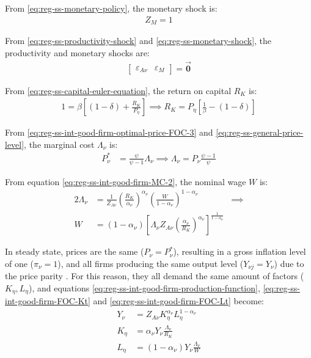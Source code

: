 \documentclass[
thesis.tex
]{subfiles}
\begin{document}
From \ref{eq:reg-ss-monetary-policy}, the monetary shock is:
\begin{align}
	Z_{M} = 1
\end{align}

From \ref{eq:reg-ss-productivity-shock} and \ref{eq:reg-ss-monetary-shock}, the productivity and monetary shocks are:
\begin{align}
	\begin{bmatrix}
		\varepsilon_{A\nu} & \varepsilon_{M}
	\end{bmatrix} = \vec{\bm{0}}
\end{align}

From \ref{eq:reg-ss-capital-euler-equation}, the return on capital $R_K$ is:
\begin{align}
	\label{eq:reg-ss-return-on-capital}
	1 = \beta \left[ (1-\delta) + \frac{R_K}{P_{\eta}} \right] \implies 
	R_K = P_{\eta} \left[ \frac{1}{\beta} - (1-\delta) \right]
\end{align}

From \ref{eq:reg-ss-int-good-firm-optimal-price-FOC-3} and \ref{eq:reg-ss-general-price-level}, the marginal cost $\Lambda_{\nu}$ is:
\begin{align}
	P_{\nu}^\ast &= \frac{\psi}{\psi-1} \Lambda_{\nu} \implies \Lambda_{\nu} = P_{\nu} \frac{\psi-1}{\psi} \label{eq:reg-ss-marginal-cost}
\end{align}

From equation \ref{eq:reg-ss-int-good-firm-MC-2}, the nominal wage $W$ is:
\begin{alignat}{2}
	\Lambda_{\nu} &= \frac{1}{Z_{A\nu}} \left( \frac{R_K}{{\alpha_\nu}} \right)^{{\alpha_\nu}} \left( \frac{W}{1-{\alpha_\nu}} \right)^{1-{\alpha_\nu}} &\implies \nonumber \\ 
	W &= (1-{\alpha_\nu}) \left[ \Lambda_{\nu} Z_{A\nu} \left( \frac{{\alpha_\nu}}{R_K} \right)^{{\alpha_\nu}} \right]^\frac{1}{1-{\alpha_\nu}} &\, \label{eq:reg-ss-nominal-wage}
\end{alignat}

In steady state, prices are the same ($P_{\nu} = P_{\nu}^\ast$), resulting in a gross inflation level of one ($\pi_{\nu} = 1$), and all firms producing the same output level ($Y_{\nu j} = Y_{\nu}$) due to the price parity \cite[Lecture 13, p.12]{solis-garcia_ucb_2022}. For this reason, they all demand the same amount of factors ($K_{\eta}, L_{\eta}$), and equations \ref{eq:reg-ss-int-good-firm-production-function}, \ref{eq:reg-ss-int-good-firm-FOC-Kt} and \ref{eq:reg-ss-int-good-firm-FOC-Lt} become:
\begin{align}
	Y_{\nu} &= Z_{A\nu} K_{\eta}^{\alpha_\nu} L_{\eta}^{1 -{\alpha_\nu}} \label{eq:reg-ss-int-good-firm-production-function-2} \\	
	K_{\eta} &= {\alpha_\nu} Y_{\nu} \frac{\Lambda_{\nu}}{R_K} \label{eq:reg-ss-int-good-firm-FOC-Kt-2} \\
	L_{\eta} &= (1-{\alpha_\nu}) Y_{\nu} \frac{\Lambda_{\nu}}{W} \label{eq:reg-ss-int-good-firm-FOC-Lt-2}
\end{align}
	
\end{document}
